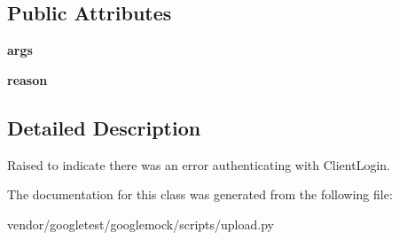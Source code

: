 \subsection*{Public Attributes}
\begin{DoxyCompactItemize}
\item 
\mbox{\label{classupload_1_1_client_login_error_ac300a0b034b2bc64cedc51e09fb6d663}} 
{\bfseries args}
\item 
\mbox{\label{classupload_1_1_client_login_error_ae0555feb182d89d1e4d7944afbfe14e5}} 
{\bfseries reason}
\end{DoxyCompactItemize}


\subsection{Detailed Description}
\begin{DoxyVerb}Raised to indicate there was an error authenticating with ClientLogin.\end{DoxyVerb}
 

The documentation for this class was generated from the following file\+:\begin{DoxyCompactItemize}
\item 
vendor/googletest/googlemock/scripts/upload.\+py\end{DoxyCompactItemize}
